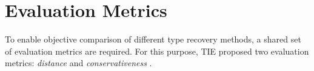 
\section{Evaluation Metrics}



To enable objective comparison of different type recovery methods, a shared set of evaluation metrics are required. For this purpose, TIE proposed two evaluation metrics: \textit{distance} and \textit{conservativeness} \cite{tie_reverse_engineering_of_types}.




